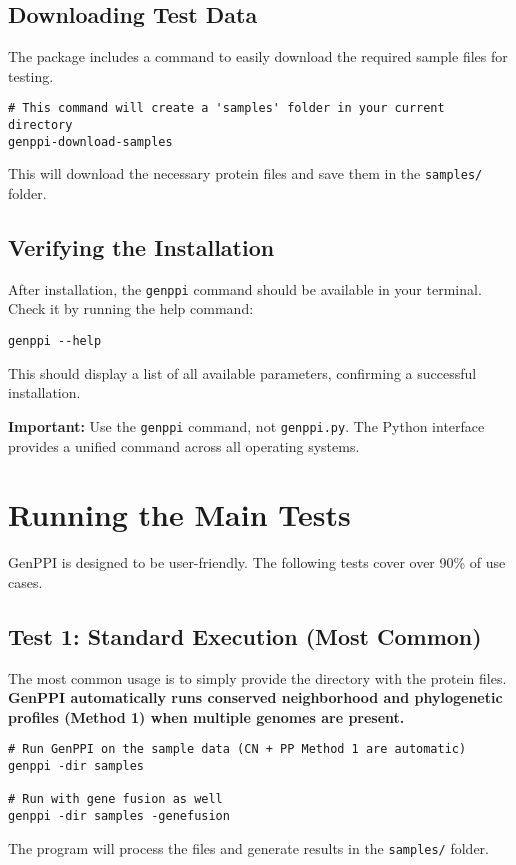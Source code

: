 \documentclass[11pt, a4paper]{article}
\begin{document}
\subsection{Downloading Test Data}
The package includes a command to easily download the required sample files for testing.
\begin{lstlisting}[style=bashstyle]
# This command will create a 'samples' folder in your current directory
genppi-download-samples
\end{lstlisting}
This will download the necessary protein files and save them in the \texttt{samples/} folder.

\subsection{Verifying the Installation}
After installation, the \texttt{genppi} command should be available in your terminal. Check it by running the help command:
\begin{lstlisting}[style=bashstyle]
genppi --help
\end{lstlisting}
This should display a list of all available parameters, confirming a successful installation.

\textbf{Important:} Use the \texttt{genppi} command, not \texttt{genppi.py}. The Python interface provides a unified command across all operating systems.

\section{Running the Main Tests}
GenPPI is designed to be user-friendly. The following tests cover over 90\% of use cases.

\subsection{Test 1: Standard Execution (Most Common)}
The most common usage is to simply provide the directory with the protein files. \textbf{GenPPI automatically runs conserved neighborhood and phylogenetic profiles (Method 1) when multiple genomes are present.}
\begin{lstlisting}[style=bashstyle]
# Run GenPPI on the sample data (CN + PP Method 1 are automatic)
genppi -dir samples

# Run with gene fusion as well
genppi -dir samples -genefusion
\end{lstlisting}
The program will process the files and generate results in the \texttt{samples/} folder.
\end{document}
